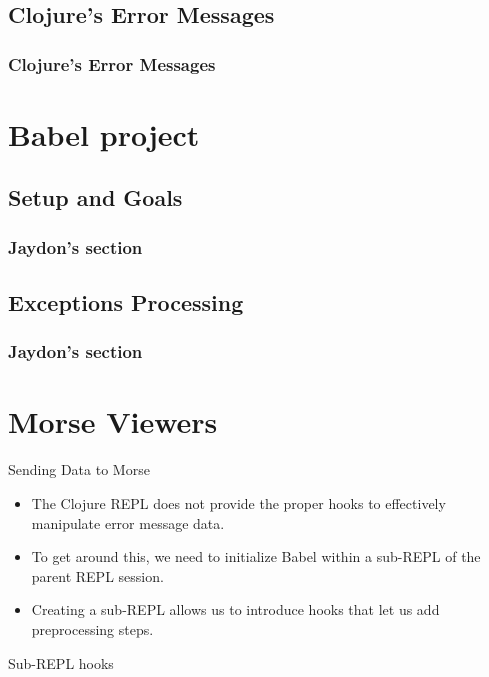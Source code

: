 \documentclass{beamer}
\begin{document}
\subsection{Clojure's Error Messages}
\begin{frame}
    \frametitle{Clojure's Error Messages}

\end{frame}

\section{Babel project}

\subsection{Setup and Goals}

\begin{frame}
\frametitle{Jaydon's section}

\end{frame}

\subsection{Exceptions Processing}

\begin{frame}
\frametitle{Jaydon's section}

\end{frame}

\section{Morse Viewers}

\begin{frame}{Sending Data to Morse}
  \begin{itemize}
    \item<1-> The Clojure REPL does not provide the proper hooks to effectively manipulate error message data.
    \item<2-> To get around this, we need to initialize Babel within a sub-REPL of the parent REPL session.
    \item<3-> Creating a sub-REPL allows us to introduce hooks that let us add preprocessing steps.
  \end{itemize}
\end{frame}

\begin{frame}{Sub-REPL hooks}

\end{frame}
\end{document}
